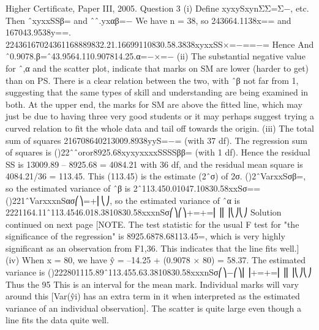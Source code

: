 Higher Certificate, Paper III, 2005. Question 3
(i) Define xyxySxynΣΣ=Σ−, etc. Then ˆxyxxSSβ= and ˆˆ.yxαβ=−
We have n = 38, so 243664.1138x== and 167043.9538y==.
22436167024361168889832.21.16699110830.58.3838xyxxSS×=−==−=
Hence And ˆ0.9078.β=ˆ43.9564.110.907814.25.α=−×=−
(ii) The substantial negative value for ˆ,α and the scatter plot, indicate that marks on SM are lower (harder to get) than on PS. There is a clear relation between the two, with ˆβ not far from 1, suggesting that the same types of skill and understanding are being examined in both.
At the upper end, the marks for SM are above the fitted line, which may just be due to having three very good students or it may perhaps suggest trying a curved relation to fit the whole data and tail off towards the origin.
(iii) The total sum of squares 216708640213009.8938yyS=−= (with 37 df).
The regression sum of squares is ()22ˆˆoror8925.68xyxyxxxxSSSSββ= (with 1 df).
Hence the residual SS is 13009.89 – 8925.68 = 4084.21 with 36 df, and the residual mean square is 4084.21/36 = 113.45.
This (113.45) is the estimate (2ˆσ) of 2σ.
()2ˆVarxxSσβ=, so the estimated variance of ˆβ is 2ˆ113.450.01047.10830.58xxSσ==
()221ˆVarxxxnSασ⎛⎞=+⎜⎝⎠, so the estimated variance of ˆα is
2221164.11ˆ113.4546.018.3810830.58xxxnSσ⎛⎞⎛⎞+=+=⎜⎟⎜⎟⎝⎠⎝⎠
Solution continued on next page
[NOTE. The test statistic for the usual F test for "the significance of the regression" is 8925.6878.68113.45=, which is very highly significant as an observation from F1,36.
This indicates that the line fits well.]
(iv) When x = 80, we have ŷ = –14.25 + (0.9078 × 80) = 58.37.
The estimated variance is ()222801115.89ˆ113.455.63.3810830.58xxxnSσ⎛⎞−⎛⎞⎜⎟+=+=⎜⎟⎜⎟⎝⎠⎝⎠
Thus the 95%
This is an interval for the mean mark. Individual marks will vary around this [Var(ŷi) has an extra term in it when interpreted as the estimated variance of an individual observation]. The scatter is quite large even though a line fits the data quite well.
